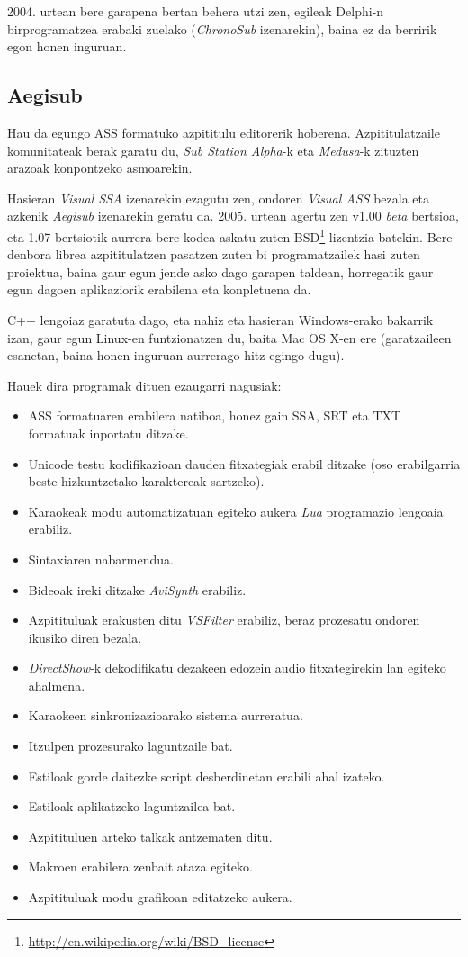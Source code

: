 2004. urtean bere garapena bertan behera utzi zen, egileak Delphi-n birprogramatzea erabaki zuelako (\textit{ChronoSub} izenarekin), baina ez da berririk egon honen inguruan.

\subsection{Aegisub}
Hau da egungo ASS formatuko azpititulu editorerik hoberena. Azpititulatzaile komunitateak berak garatu du, \textit{Sub Station Alpha}-k eta \textit{Medusa}-k zituzten arazoak konpontzeko asmoarekin.

Hasieran \textit{Visual SSA} izenarekin ezagutu zen, ondoren \textit{Visual ASS} bezala eta azkenik \textit{Aegisub} izenarekin geratu da. 2005. urtean agertu zen v1.00 \textit{beta} bertsioa, eta 1.07 bertsiotik aurrera bere kodea askatu zuten BSD\footnote{\url{http://en.wikipedia.org/wiki/BSD_license}} lizentzia batekin. Bere denbora librea azpititulatzen pasatzen zuten bi programatzailek hasi zuten proiektua, baina gaur egun jende asko dago garapen taldean, horregatik gaur egun dagoen aplikaziorik erabilena eta konpletuena da.

C++ lengoiaz garatuta dago, eta nahiz eta hasieran Windows-erako bakarrik izan, gaur egun Linux-en funtzionatzen du, baita Mac OS X-en ere (garatzaileen esanetan, baina honen inguruan aurrerago hitz egingo dugu).

Hauek dira programak dituen ezaugarri nagusiak:
\begin{itemize}
\item ASS formatuaren erabilera natiboa, honez gain SSA, SRT eta TXT formatuak inportatu ditzake.
\item Unicode testu kodifikazioan dauden fitxategiak erabil ditzake (oso erabilgarria beste hizkuntzetako karaktereak sartzeko).
\item Karaokeak modu automatizatuan egiteko aukera \textit{Lua} programazio lengoaia erabiliz.
\item Sintaxiaren nabarmendua.
\item Bideoak ireki ditzake \textit{AviSynth} erabiliz.
\item Azpitituluak erakusten ditu \textit{VSFilter} erabiliz, beraz prozesatu ondoren ikusiko diren bezala.
\item \textit{DirectShow}-k dekodifikatu dezakeen edozein audio fitxategirekin lan egiteko ahalmena.
\item Karaokeen sinkronizazioarako sistema aurreratua.
\item Itzulpen prozesurako laguntzaile bat.
\item Estiloak gorde daitezke script desberdinetan erabili ahal izateko.
\item Estiloak aplikatzeko laguntzailea bat.
\item Azpitituluen arteko talkak antzematen ditu.
\item Makroen erabilera zenbait ataza egiteko.
\item Azpitituluak modu grafikoan editatzeko aukera.
\end{itemize}

